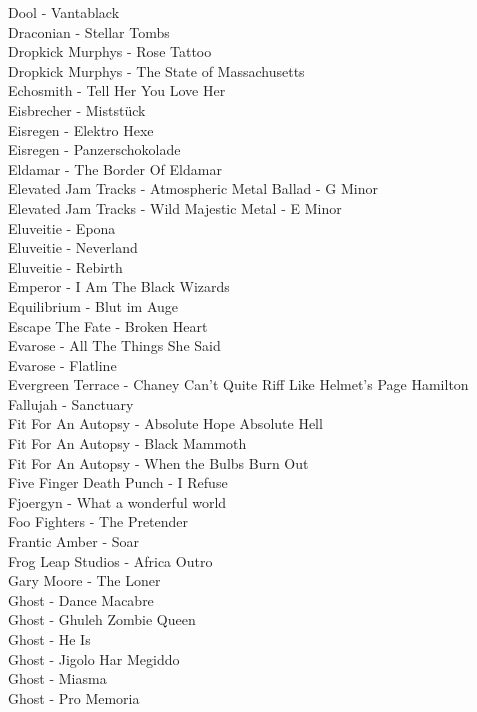 Dool - Vantablack\\
Draconian - Stellar Tombs\\
Dropkick Murphys - Rose Tattoo\\
Dropkick Murphys - The State of Massachusetts\\
Echosmith - Tell Her You Love Her\\
Eisbrecher - Miststück\\
Eisregen - Elektro Hexe\\
Eisregen - Panzerschokolade\\
Eldamar - The Border Of Eldamar\\
Elevated Jam Tracks - Atmospheric Metal Ballad - G Minor\\
Elevated Jam Tracks - Wild Majestic Metal - E Minor\\
Eluveitie - Epona\\
Eluveitie - Neverland\\
Eluveitie - Rebirth\\
Emperor - I Am The Black Wizards\\
Equilibrium - Blut im Auge\\
Escape The Fate - Broken Heart\\
Evarose - All The Things She Said\\
Evarose - Flatline\\
Evergreen Terrace - Chaney Can't Quite Riff Like Helmet's Page Hamilton\\
Fallujah - Sanctuary\\
Fit For An Autopsy - Absolute Hope Absolute Hell\\
Fit For An Autopsy - Black Mammoth\\
Fit For An Autopsy - When the Bulbs Burn Out\\
Five Finger Death Punch - I Refuse\\
Fjoergyn - What a wonderful world\\
Foo Fighters - The Pretender\\
Frantic Amber - Soar\\
Frog Leap Studios - Africa Outro\\
Gary Moore - The Loner\\
Ghost - Dance Macabre\\
Ghost - Ghuleh Zombie Queen\\
Ghost - He Is\\
Ghost - Jigolo Har Megiddo\\
Ghost - Miasma\\
Ghost - Pro Memoria\\

